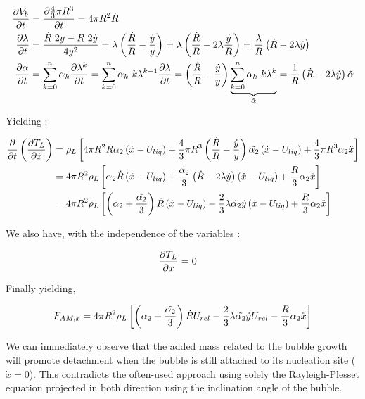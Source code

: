 \begin{align}
\frac{\partial V_{b}}{\partial t}&=\frac{\partial \frac{4}{3}\pi R^{3}}{\partial t} = 4\pi R^{2} \dot{R}\\
\frac{\partial \lambda}{\partial t}&=\frac{\dot{R}~2y-R~2\dot{y}}{4y^{2}}=\lambda\left(  \frac{\dot{R}}{R} - \frac{\dot{y}}{y}   \right)=\lambda \left( \frac{\dot{R}}{R}-2\lambda \frac{\dot{y}}{R} \right)=\frac{\lambda}{R}\left( \dot{R}-2\lambda \dot{y} \right)\\
\frac{\partial \alpha}{\partial t}&=\sum_{k=0}^{n}\alpha_{k}\frac{\partial \lambda ^{k}}{\partial t} = \sum_{k=0}^{n}\alpha_{k}~k\lambda ^{k-1} \frac{\partial \lambda}{\partial t} = \left(  \frac{\dot{R}}{R} - \frac{\dot{y}}{y}   \right)\underbrace{ \sum_{k=0}^{n}\alpha_{k}~k\lambda^{k} }_{\tilde{\alpha}} = \frac{1}{R}\left( \dot{R}-2\lambda \dot{y} \right)\tilde{\alpha}
\end{align}

Yielding : 

\begin{align}
\frac{\partial }{\partial t}\left(  \frac{\partial T_{L}}{\partial \dot{x}} \right)&=\rho_{L}\left[  4\pi R^{2} \dot{R} \alpha_{2}\left( \dot{x}-U_{liq} \right)+\frac{4}{3}\pi R^{3}\left(  \frac{\dot{R}}{R} - \frac{\dot{y}}{y}  \right)\tilde{\alpha_{2}}\left( \dot{x}-U_{liq} \right)+\frac{4}{3}\pi R^{3}\alpha_{2} \ddot{x}  \right] \\
&=4\pi R^{2} \rho_{L}\left[  \alpha_{2}\dot{R}\left( \dot{x}-U_{liq} \right)+\frac{\tilde{\alpha_{2}}}{3}\left( \dot{R}- 2\lambda \dot{y}  \right)\left( \dot{x}-U_{liq} \right) + \frac{R}{3}\alpha_{2}\ddot{x}  \right]\\
&=4 \pi R^{2} \rho_{L}\left[ \left( \alpha_{2}+\frac{\tilde{\alpha_{2}}}{3} \right)\dot{R}\left( \dot{x}-U_{liq} \right)-\frac{2}{3}\lambda \tilde{\alpha_{2}}\dot{y}\left( \dot{x}-U_{liq} \right)+\frac{R}{3}\alpha_{2}\ddot{x}  \right]
\end{align}

We also have, with the independence of the variables :

\begin{align}
\frac{\partial T_{L}}{\partial x}&=0
\end{align}


Finally yielding, 

\begin{align}
F_{AM,x}=4\pi R^{2}\rho_{L} \left[ \left( \alpha_{2}+\frac{\tilde{\alpha_{2}}}{3} \right)\dot{R}U_{rel}-\frac{2}{3}\lambda \tilde{\alpha_{2}}\dot{y}U_{rel}-\frac{R}{3}\alpha_{2}\ddot{x}  \right]
\end{align}

We can immediately observe that the added mass related to the bubble growth will promote detachment when the bubble is still attached to its nucleation site ($\dot{x}=0$). This contradicts the often-used approach using solely the Rayleigh-Plesset equation projected in both direction using the inclination angle of the bubble. 


